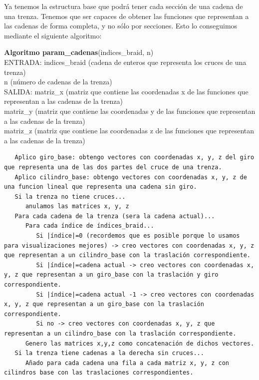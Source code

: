  \bigskip
 Ya tenemos la estructura base que podrá tener cada sección de una cadena de una trenza. Tenemos que ser capaces de obtener las funciones que representan a las cadenas de forma completa, y no sólo por secciones. Esto lo conseguimos mediante el siguiente algoritmo:
 \begin{alg}
 	\textbf{Algoritmo param\_cadenas}(indices\_braid, n)\\
 	ENTRADA: indices\_braid (cadena de enteros que representa los cruces de una trenza)\\
 	\hspace*{2.2cm} n (número de cadenas de la trenza)\\
 	SALIDA: \hspace{0.4cm} matriz\_x (matriz que contiene las coordenadas x de las funciones que representan a las cadenas de la trenza)\\
 	\hspace*{2.2cm} matriz\_y (matriz que contiene las coordenadas y de las funciones que representan a las cadenas de la trenza)\\
 	\hspace*{2.2cm} matriz\_z (matriz que contiene las coordenadas z de las funciones que representan a las cadenas de la trenza)
 	
\begin{lstlisting}
   Aplico giro_base: obtengo vectores con coordenadas x, y, z del giro que representa una de las dos partes del cruce de una trenza. 
   Aplico cilindro_base: obtengo vectores con coordenadas x, y, z de una funcion lineal que representa una cadena sin giro. 
   Si la trenza no tiene cruces...
      anulamos las matrices x, y, z 
   Para cada cadena de la trenza (sera la cadena actual)...
      Para cada índice de índices_braid...
         Si |índice|=0 (recordemos que es posible porque lo usamos para visualizaciones mejores) -> creo vectores con coordenadas x, y, z que representan a un cilindro_base con la traslación correspondiente.
         Si |índice|=cadena actual -> creo vectores con coordenadas x, y, z que representan a un giro_base con la traslación y giro correspondiente.  
         Si |índice|=cadena actual -1 -> creo vectores con coordenadas x, y, z que representan a un giro_base con la traslación correspondiente.
         Si no -> creo vectores con coordenadas x, y, z que representan a un cilindro_base con la traslación correspondiente. 
      Genero las matrices x,y,z como concatenación de dichos vectores. 
   Si la trenza tiene cadenas a la derecha sin cruces...
      Añado para cada cadena una fila a cada matriz x, y, z con cilindros base con las traslaciones correspondientes. 
      
         
\end{lstlisting}
 \end{alg}
 
